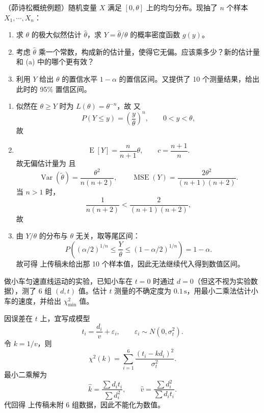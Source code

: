 \begin{question}
（茆诗松概统例题）随机变量 $X$ 满足 $[0,\theta]$ 上的均匀分布。现抽了 $n$ 个样本 $X_1,\cdots,X_n$：
\begin{enumerate}[label=(\alph*),leftmargin=2.8em,itemsep=0.2em]
\item 求 $\theta$ 的极大似然估计 $\hat\theta$，求 $Y=\hat\theta/\theta$ 的概率密度函数 $g(y)$。
\item 考虑 $\hat\theta$ 乘一个常数，构成新的估计量，使得它无偏。应该乘多少？新的估计量和 (a) 中的哪个更有效？
\item 利用 $Y$ 给出 $\theta$ 的置信水平 $1-\alpha$ 的置信区间。又提供了 10 个测量结果，给出此时的 95\% 置信区间。
\end{enumerate}
\begin{solution}
\begin{enumerate}[label=(\arabic*),leftmargin=2.8em,itemsep=0.2em]
\item 似然在 $\theta\ge Y$ 时为 $L(\theta)=\theta^{-n}$，故
又
\[
P(Y\le y)=\left(\frac{y}{\theta}\right)^n,\qquad 0<y<\theta,
\]
故
\item
\[
\operatorname{E}[Y]=\frac{n}{n+1}\theta,
\qquad c=\frac{n+1}{n}.
\]
故无偏估计量为
且
\[
\operatorname{Var}(\tilde\theta)=\frac{\theta^2}{n(n+2)},
\qquad
\operatorname{MSE}(Y)=\frac{2\theta^2}{(n+1)(n+2)}.
\]
当 $n>1$ 时，
\[
\frac{1}{n(n+2)}<\frac{2}{(n+1)(n+2)},
\]
故
\item 由 $Y/\theta$ 的分布与 $\theta$ 无关，取等尾区间：
\[
P\left((\alpha/2)^{1/n}\le \frac{Y}{\theta}\le (1-\alpha/2)^{1/n}\right)=1-\alpha.
\]
故可得
上传稿未给出那 10 个样本值，因此无法继续代入得到数值区间。
\end{enumerate}
\end{solution}
\end{question}

\begin{question}
做小车匀速直线运动的实验，已知小车在 $t=0$ 时通过 $d=0$（但这不视为实验数据），测了 6 组 $(d,t)$ 值。估计 $t$ 测量的不确定度为 $0.1\,\mathrm s$，用最小二乘法估计小车的速度，并给出 $\chi^2_{\min}$ 值。
\begin{solution}
因误差在 $t$ 上，宜写成模型
\[
t_i=\frac{d_i}{v}+\varepsilon_i,
\qquad \varepsilon_i\sim N(0,\sigma_t^2).
\]
令 $k=1/v$，则
\[
\chi^2(k)=\sum_{i=1}^6\frac{(t_i-kd_i)^2}{\sigma_t^2}.
\]
最小二乘解为
\[
\hat k=\frac{\sum d_i t_i}{\sum d_i^2},
\qquad
\hat v=\frac{\sum d_i^2}{\sum d_i t_i}.
\]
代回得
上传稿未附 6 组数据，因此不能化为数值。
\end{solution}
\end{question}

